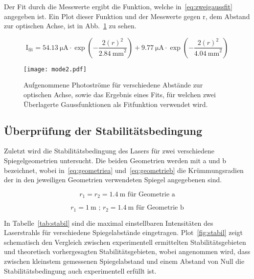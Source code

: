 Der Fit durch die Messwerte ergibt die Funktion, welche 
in~\eqref{eq:zweigaussfit} angegeben ist. Ein Plot dieser 
Funktion und der Messwerte gegen r, dem Abstand zur 
optischen Achse, ist in Abb.~\ref{fig:mode2} zu sehen.

\begin{equation}
\text{I}_\text{fit} = 
\SI{54.13}{\micro\ampere}\cdot 
\exp{\left(-\frac{2(r)^2}{\SI{2.84}{\milli\metre}^2}\right)}+
\SI{9.77}{\micro\ampere}\cdot 
\exp{\left(-\frac{2(r)^2}{\SI{4.04}{\milli\metre}^2}\right)}
\label{eq:zweigaussfit}
\end{equation}

%
\begin{figure}
\centering
  \texttt{[image: mode2.pdf]}
  \caption{Aufgenommene Photoströme für verschiedene Abstände 
zur optischen Achse, sowie das Ergebnis eines Fits, für welchen 
zwei Überlagerte Gaussfunktionen als Fitfunktion verwendet wird.}
\label{fig:mode2}
\end{figure}
%

\FloatBarrier

\subsection{Überprüfung der Stabilitätsbedingung}
%
Zuletzt wird die Stabilitätsbedingung des Lasers für 
zwei verschiedene Spiegelgeometrien untersucht.
Die beiden Geometrien werden mit a und b bezeichnet, 
wobei in~\eqref{eq:geometriea} 
und~\eqref{eq:geometrieb} die Krümmungsradien der 
in den jeweiligen Geometrien verwendeten Spiegel 
angegebenen sind.

\begin{equation}
r_1 = r_2 = \SI{1.4}{\metre}\text{ für Geometrie a}
\label{eq:geometriea}
\end{equation} 

\begin{equation}
r_1 = \SI{1}{\metre}\text{ ; }r_2=\SI{1.4}{\metre}\text{ für Geometrie b}
\label{eq:geometrieb}
\end{equation}

In Tabelle~\ref{tab:stabil} sind die maximal einstellbaren 
Intensitäten des Laserstrahls für verschiedene Spiegelabstände 
eingetragen. Plot~\ref{fig:stabil} zeigt schematisch den 
Vergleich zwischen experimentell ermittelten Stabilitätsgebieten 
und theoretisch vorhergesagten Stabilitätsgebieten, wobei 
angenommen wird, dass zwischen kleinstem gemessenen 
Spiegelabstand und einem Abstand von Null die 
Stabilitätsbedingung auch experimentell erfüllt ist.


